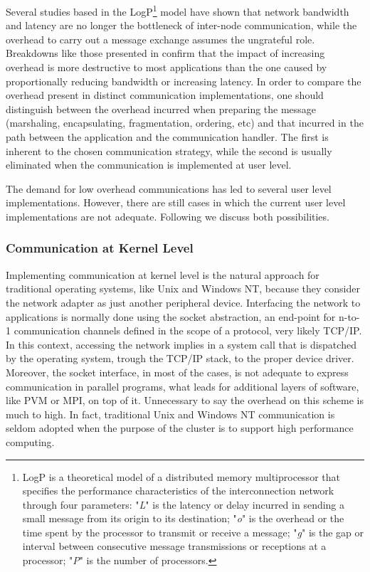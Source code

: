 	Several studies based in the LogP\footnote{LogP is a theoretical model of a distributed memory multiprocessor that specifies the performance characteristics of the interconnection network through four parameters: "{\em L}" is the latency or delay incurred in sending a small message from its origin to its destination; "{\em o}" is the overhead or the time spent by the processor to transmit or receive a message; "{\em g}" is the gap or interval between consecutive message transmissions or receptions at a processor; "{\em P}" is the number of processors.} model \cite{Culler:96} have shown that network bandwidth and latency are no longer the bottleneck of inter-node communication, while the overhead to carry out a message exchange assumes the ungrateful role. Breakdowns like those presented in \cite{Martin:97, Lumetta:97, Tanaka:98} confirm that the impact of increasing overhead is more destructive to most applications than the one caused by proportionally reducing bandwidth or increasing latency. In order to compare the overhead present in distinct communication implementations, one should distinguish between the overhead incurred when preparing the message (marshaling, encapsulating, fragmentation, ordering, etc) and that incurred in the path between the application and the communication handler. The first is inherent to the chosen communication strategy, while the second is usually eliminated when the communication is implemented at user level.
	
	The demand for low overhead communications has led to several user level implementations. However, there are still cases in which the current user level implementations are not adequate. Following we discuss both possibilities.


\subsubsection{\label{soft_comm_kern}Communication at Kernel Level}

	Implementing communication at kernel level is the natural approach for traditional operating systems, like Unix and Windows NT, because they consider the network adapter as just another peripheral device. Interfacing the network to applications is normally done using the socket abstraction, an end-point for n-to-1 communication channels defined in the scope of a protocol, very likely TCP/IP. In this context, accessing the network implies in a system call that is dispatched by the operating system, trough the TCP/IP stack, to the proper device driver. Moreover, the socket interface, in most of the cases, is not adequate to express communication in parallel programs, what leads for additional layers of software, like PVM or MPI, on top of it. Unnecessary to say the overhead on this scheme is much to high. In fact, traditional Unix and Windows NT communication is seldom adopted when the purpose of the cluster is to support high performance computing.
	
